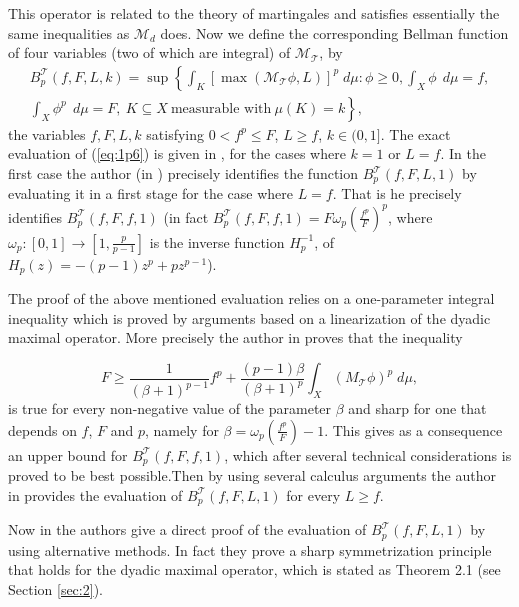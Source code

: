\documentclass{article}
\numberwithin{equation}{section}
\theoremstyle{definition}
\theoremstyle{remark}
\newcommand{\mr}[1]{\mathrm{#1}}
\newcommand{\mc}[1]{\mathcal{#1}}
\begin{document}
This operator is related to the theory of martingales and satisfies essentially the same inequalities as $\mc M_d$ does. Now we define the corresponding Bellman function of four variables (two of which are integral) of $\mc M_{\mc T}$, by
\begin{multline} \label{eq:1p6}
B_p^{\mc T}(f,F,L,k) = \sup \left\{ \int_K \left[ \max(\mc M_{\mc T}\phi, L)\right]^p\mr \; d\mu: \phi\geq 0, \int_X\phi\,\mr \; d\mu=f, \right. \\  \left. \int_X\phi^p\,\mr \; d\mu = F,\ K\subseteq X\ \text{measurable with}\ \mu(K)=k\right\},
\end{multline}
the variables $f, F, L, k$ satisfying $0<f^p\leq F $, $L\geq f$, $k\in (0,1]$.
%
The exact evaluation of (\ref{eq:1p6}) is given in \cite{M}, for the cases where $k=1$ or $L=f$. In the first case the author (in \cite{M}) precisely identifies the function $B_p^{\mc T}(f,F,L,1)$ by evaluating it in a first stage for the case where $L=f$. That is he precisely identifies $B_p^{\mc T}(f,F,f,1)$ (in fact $B_p^{\mc T}(f,F,f,1)=F \omega_p (\frac{f^p}{F})^p$, where                         $\omega_p: [0,1] \to [1,\frac{p}{p-1}]$ is the inverse function $H^{-1}_p$, of $H_p(z) = -(p-1)z^p + pz^{p-1}$). 

The proof of the above mentioned evaluation relies on a one-parameter integral inequality which is proved by arguments based on a linearization of the dyadic maximal operator. More precisely the author in \cite{M} proves that the inequality

\begin{equation}\label{eq:1p7}
F\geq \frac{1}{(\beta+1)^{p-1}} f^p + \frac{(p-1)\beta}{(\beta+1)^p} \int_X (M_{\mathcal{T}}\phi)^p \; d\mu,
\end{equation}
is true for every non-negative value of the parameter $\beta$ and sharp for one that depends on $f$, $F$ and $p$, namely for $\beta=\omega_p (\frac{f^p}{F})-1$. This gives as a consequence an upper bound for $B_p^{\mc T}(f,F,f,1)$, which after several technical considerations is proved to be best possible.Then  by using several calculus arguments the author in \cite{M} provides the evaluation of $B_p^{\mc T}(f,F,L,1)$ for every $L\geq f$. 

Now in \cite{NM} the authors give a direct proof of the evaluation of $B_p^{\mc T}(f,F,L,1)$ by using alternative methods. In fact they prove a sharp symmetrization principle that holds for the dyadic maximal operator, which is stated as Theorem 2.1 (see Section \ref{sec:2}).
\end{document}
